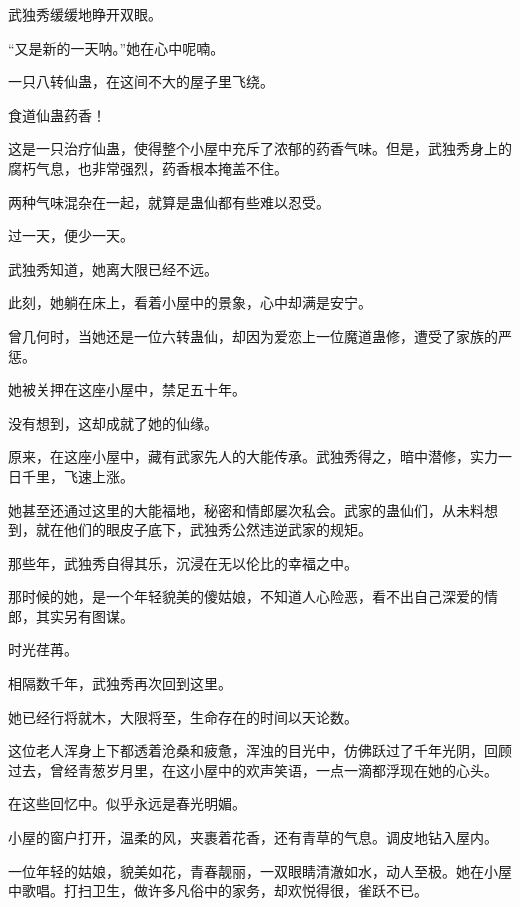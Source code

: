 
\begin{this_body}



武独秀缓缓地睁开双眼。

“又是新的一天呐。”她在心中呢喃。

一只八转仙蛊，在这间不大的屋子里飞绕。

食道仙蛊药香！

这是一只治疗仙蛊，使得整个小屋中充斥了浓郁的药香气味。但是，武独秀身上的腐朽气息，也非常强烈，药香根本掩盖不住。

两种气味混杂在一起，就算是蛊仙都有些难以忍受。

过一天，便少一天。

武独秀知道，她离大限已经不远。

此刻，她躺在床上，看着小屋中的景象，心中却满是安宁。

曾几何时，当她还是一位六转蛊仙，却因为爱恋上一位魔道蛊修，遭受了家族的严惩。

她被关押在这座小屋中，禁足五十年。

没有想到，这却成就了她的仙缘。

原来，在这座小屋中，藏有武家先人的大能传承。武独秀得之，暗中潜修，实力一日千里，飞速上涨。

她甚至还通过这里的大能福地，秘密和情郎屡次私会。武家的蛊仙们，从未料想到，就在他们的眼皮子底下，武独秀公然违逆武家的规矩。

那些年，武独秀自得其乐，沉浸在无以伦比的幸福之中。

那时候的她，是一个年轻貌美的傻姑娘，不知道人心险恶，看不出自己深爱的情郎，其实另有图谋。

时光荏苒。

相隔数千年，武独秀再次回到这里。

她已经行将就木，大限将至，生命存在的时间以天论数。

这位老人浑身上下都透着沧桑和疲惫，浑浊的目光中，仿佛跃过了千年光阴，回顾过去，曾经青葱岁月里，在这小屋中的欢声笑语，一点一滴都浮现在她的心头。

在这些回忆中。似乎永远是春光明媚。

小屋的窗户打开，温柔的风，夹裹着花香，还有青草的气息。调皮地钻入屋内。

一位年轻的姑娘，貌美如花，青春靓丽，一双眼睛清澈如水，动人至极。她在小屋中歌唱。打扫卫生，做许多凡俗中的家务，却欢悦得很，雀跃不已。


\end{this_body}
